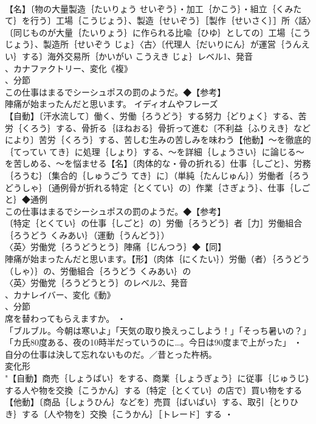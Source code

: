 \documentclass[8pt]{extreport}
\begin{document}
\begin{CJK}{UTF8}{min}
\\	【名】〔物の大量製造｛たいりょう せいぞう｝・加工｛かこう｝・組立｛くみたて｝を行う〕工場｛こうじょう｝、製造｛せいぞう｝［製作｛せいさく｝］所〈話〉〔同じものが大量｛たいりょう｝に作られる比喩｛ひゆ｝としての〕工場｛こうじょう｝、製造所｛せいぞう じょ｝〈古〉〔代理人｛だいりにん｝が運営｛うんえい｝する〕海外交易所｛かいがい こうえき じょ｝レベル1、発音
\\	、カナファクトリー、変化《複》
\\	、分節
\\	この仕事はまるでシーシュポスの罰のようだ。◆【参考】
\\	陣痛が始まったんだと思います。	イディオムやフレーズ 
\\	【自動】〔汗水流して〕働く、労働｛ろうどう｝する努力｛どりょく｝する、苦労｛くろう｝する、骨折る｛ほねおる｝骨折って進む〔不利益｛ふりえき｝などにより〕苦労｛くろう｝する、苦しむ生みの苦しみを味わう【他動】～を徹底的｛てってい てき｝に処理｛しょり｝する、～を詳細｛しょうさい｝に論じる～を苦しめる、～を悩ませる【名】〔肉体的な・骨の折れる〕仕事｛しごと｝、労務｛ろうむ｝〔集合的｛しゅうごう てき｝に〕（単純｛たんじゅん｝）労働者｛ろうどうしゃ｝〔通例骨が折れる特定｛とくてい｝の〕作業｛さぎょう｝、仕事｛しごと｝◆通例
\\	この仕事はまるでシーシュポスの罰のようだ。◆【参考】
\\	〔特定｛とくてい｝の仕事｛しごと｝の〕労働｛ろうどう｝者［力］労働組合｛ろうどう くみあい｝（運動｛うんどう｝）
\\	〈英〉労働党｛ろうどうとう｝陣痛｛じんつう｝◆【同】
\\	陣痛が始まったんだと思います。【形】（肉体｛にくたい｝）労働（者）｛ろうどう（しゃ）｝の、労働組合｛ろうどう くみあい｝の
\\	〈英〉労働党｛ろうどうとう｝のレベル2、発音
\\	、カナレイバー、変化《動》
\\	、分節
\\	席を替わってもらえますか。 ・
\\	「ブルブル。今朝は寒いよ」「天気の取り換えっこしよう！」「そっち暑いの？」「カ氏80度ある、夜の10時半だっていうのに…。今日は90度まで上がった」 ・
\\	自分の仕事は決して忘れないものだ。／昔とった杵柄。
\\	変化形 
\\	"【自動】商売｛しょうばい｝をする、商業｛しょうぎょう｝に従事｛じゅうじ｝する人や物を交換｛こうかん｝する〔特定｛とくてい｝の店で〕買い物をする【他動】〔商品｛しょうひん｝などを〕売買｛ばいばい｝する、取引｛とりひき｝する〔人や物を〕交換｛こうかん｝［トレード］する ・

\end{CJK}
\end{document}
